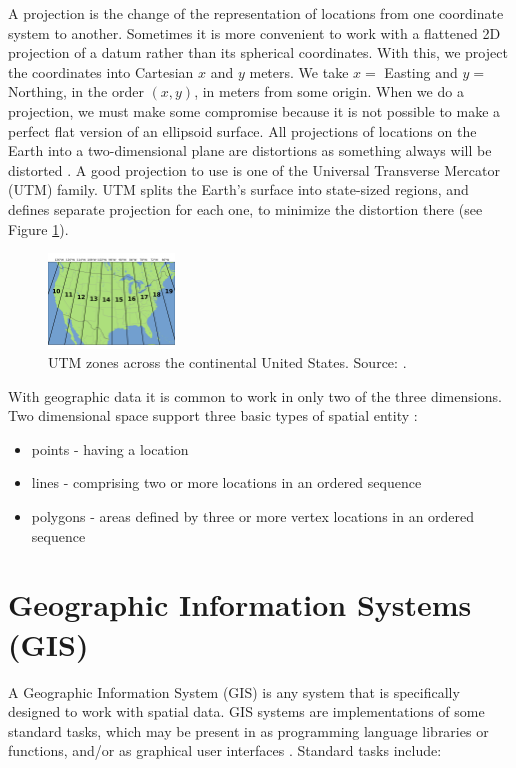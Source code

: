 A projection is the change of the representation of locations from one coordinate system to another. Sometimes it is more convenient to work with a flattened 2D projection of a datum rather than its spherical coordinates. With this, we project the coordinates into Cartesian $x$ and $y$ meters. We take $x=$ Easting and $y=$ Northing, in the order $(x, y)$, in meters from some origin. When we do a projection, we must make some compromise because it is not possible to make a perfect flat version of an ellipsoid surface. All projections of locations on the Earth into a two-dimensional plane are distortions as something always will be distorted \cite{lapaine_choosing_2017}. A good projection to use is one of the Universal Transverse Mercator (UTM) family. UTM splits the Earth's surface into state-sized regions, and defines separate projection for each one, to minimize the distortion there (see Figure \ref{fig:utm-zones}).

\begin{figure}[h!]
	\centering
	\includegraphics[width=0.3\textwidth]{Figures/UTM-zones.png}
	\caption{UTM zones across the continental United States. Source: \cite{chrismurf_2009}.
		\label{fig:utm-zones}}
\end{figure}

With geographic data it is common to work in only two of the three dimensions. Two dimensional space support three basic types of spatial entity \cite{iso_simple_features}:

\begin{itemize}
	\item points - having a location
	\item lines - comprising two or more locations in an ordered sequence
	\item polygons - areas defined by three or more vertex locations in an ordered sequence
\end{itemize}

\section{Geographic Information Systems (GIS)}

A Geographic Information System (GIS) is any system that is specifically designed to work with spatial data. GIS systems are implementations of some standard tasks, which may be present in as programming language libraries or functions, and/or as graphical user interfaces \cite{fox_spatial_2018}. Standard tasks include:

